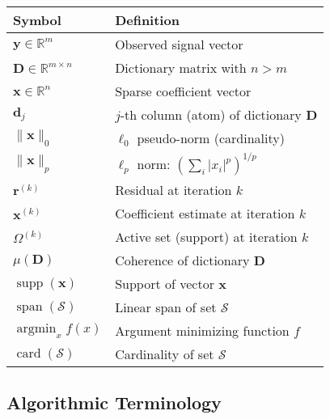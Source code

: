 \documentclass[12pt]{article}
\DeclareMathOperator{\supp}{supp}
\DeclareMathOperator{\argmin}{argmin}
\DeclareMathOperator{\spn}{span}
\DeclareMathOperator{\card}{card}
\begin{document}
\begin{center}
    \begin{tabular}{ll}
        \toprule
        \textbf{Symbol}                          & \textbf{Definition}                             \\
        \midrule
        $\mathbf{y} \in \mathbb{R}^m$            & Observed signal vector                          \\
        $\mathbf{D} \in \mathbb{R}^{m \times n}$ & Dictionary matrix with $n > m$                  \\
        $\mathbf{x} \in \mathbb{R}^n$            & Sparse coefficient vector                       \\
        $\mathbf{d}_j$                           & $j$-th column (atom) of dictionary $\mathbf{D}$ \\
        $\|\mathbf{x}\|_0$                       & $\ell_0$ pseudo-norm (cardinality)              \\
        $\|\mathbf{x}\|_p$                       & $\ell_p$ norm: $(\sum_i |x_i|^p)^{1/p}$         \\
        $\mathbf{r}^{(k)}$                       & Residual at iteration $k$                       \\
        $\mathbf{x}^{(k)}$                       & Coefficient estimate at iteration $k$           \\
        $\Omega^{(k)}$                           & Active set (support) at iteration $k$           \\
        $\mu(\mathbf{D})$                        & Coherence of dictionary $\mathbf{D}$            \\
        $\supp(\mathbf{x})$                      & Support of vector $\mathbf{x}$                  \\
        $\spn(\mathcal{S})$                      & Linear span of set $\mathcal{S}$                \\
        $\argmin_x f(x)$                         & Argument minimizing function $f$                \\
        $\card(\mathcal{S})$                     & Cardinality of set $\mathcal{S}$                \\
        \bottomrule
    \end{tabular}
\end{center}

\subsection{Algorithmic Terminology}
\end{document}
